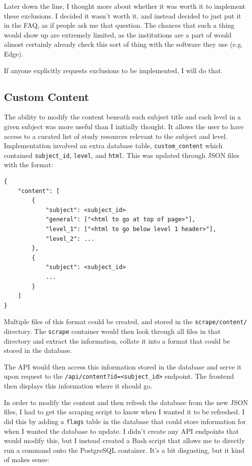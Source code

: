 \documentclass{article}
\begin{document}
Later down the line, I thought more about whether it was worth it to implement these exclusions. I decided it wasn't worth it, and instead decided to just put it in the FAQ, as if people ask me that question. The chances that such a thing would show up are extremely limited, as the institutions are a part of would almost certainly already check this sort of thing with the software they use (e.g. Edge).

If anyone explicitly requests exclusions to be implemented, I will do that.

\subsection*{Custom Content}
The ability to modify the content beneath each subject title and each level in a given subject was more useful than I initially thought. It allows the user to have access to a curated list of study resources relevant to the subject and level. Implementation involved an extra database table, \texttt{custom\_content} which contained \texttt{subject\_id}, \texttt{level}, and \texttt{html}. This was updated through JSON files with the format:

\begin{verbatim}
{
    "content": [
        {
            "subject": <subject_id>
            "general": ["<html to go at top of page>"],
            "level_1": ["<html to go below level 1 header>"],
            "level_2": ...
        },
        {
            "subject": <subject_id>
            ...
        }
    ]
}
\end{verbatim}

Multiple files of this format could be created, and stored in the \texttt{scrape/content/} directory. The \texttt{scrape} container would then look through all files in that directory and extract the information, collate it into a format that could be stored in the database.

The API would then access this information stored in the database and serve it upon request to the \texttt{/api/content?id=<subject\_id>} endpoint. The frontend then displays this information where it should go.

In order to modify the content and then refresh the database from the new JSON files, I had to get the scraping script to know when I wanted it to be refreshed. I did this by adding a \texttt{flags} table in the database that could store information for when I wanted the database to update. I didn't create any API endpoints that would modify this, but I instead created a Bash script that allows me to directly run a command onto the PostgreSQL container. It's a bit disgusting, but it kind of makes sense:
\end{document}
